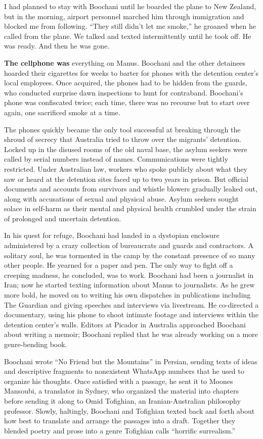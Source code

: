 I had planned to stay with Boochani until he boarded the plane to New
Zealand, but in the morning, airport personnel marched him through
immigration and blocked me from following. ``They still didn't let me
smoke,'' he groaned when he called from the plane. We talked and texted
intermittently until he took off. He was ready. And then he was gone.

\textbf{The cellphone was} everything on Manus. Boochani and the other
detainees hoarded their cigarettes for weeks to barter for phones with
the detention center's local employees. Once acquired, the phones had to
be hidden from the guards, who conducted surprise dawn inspections to
hunt for contraband. Boochani's phone was confiscated twice; each time,
there was no recourse but to start over again, one sacrificed smoke at a
time.

The phones quickly became the only tool successful at breaking through
the shroud of secrecy that Australia tried to throw over the migrants'
detention. Locked up in the disused rooms of the old naval base, the
asylum seekers were called by serial numbers instead of names.
Communications were tightly restricted. Under Australian law, workers
who spoke publicly about what they saw or heard at the detention sites
faced up to two years in prison. But official documents and accounts
from survivors and whistle blowers gradually leaked out, along with
accusations of sexual and physical abuse. Asylum seekers sought solace
in self-harm as their mental and physical health crumbled under the
strain of prolonged and uncertain detention.

In his quest for refuge, Boochani had landed in a dystopian enclosure
administered by a crazy collection of bureaucrats and guards and
contractors. A solitary soul, he was tormented in the camp by the
constant presence of so many other people. He yearned for a paper and
pen. The only way to fight off a creeping madness, he concluded, was to
work. Boochani had been a journalist in Iran; now he started texting
information about Manus to journalists. As he grew more bold, he moved
on to writing his own dispatches in publications including The Guardian
and giving speeches and interviews via livestream. He co-directed a
documentary, using his phone to shoot intimate footage and interviews
within the detention center's walls. Editors at Picador in Australia
approached Boochani about writing a memoir; Boochani replied that he was
already working on a more genre-bending book.

Boochani wrote ``No Friend but the Mountains'' in Persian, sending texts
of ideas and descriptive fragments to nonexistent WhatsApp numbers that
he used to organize his thoughts. Once satisfied with a passage, he sent
it to Moones Mansoubi, a translator in Sydney, who organized the
material into chapters before sending it along to Omid Tofighian, an
Iranian-Australian philosophy professor. Slowly, haltingly, Boochani and
Tofighian texted back and forth about how best to translate and arrange
the passages into a draft. Together they blended poetry and prose into a
genre Tofighian calls ``horrific surrealism.''


